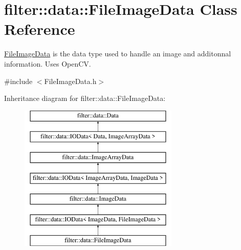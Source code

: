 \hypertarget{classfilter_1_1data_1_1_file_image_data}{}\section{filter\+:\+:data\+:\+:File\+Image\+Data Class Reference}
\label{classfilter_1_1data_1_1_file_image_data}


\hyperlink{classfilter_1_1data_1_1_file_image_data}{File\+Image\+Data} is the data type used to handle an image and additonnal information. Uses Open\+CV.  




{\ttfamily \#include $<$File\+Image\+Data.\+h$>$}

Inheritance diagram for filter\+:\+:data\+:\+:File\+Image\+Data\+:\begin{figure}[H]
\begin{center}
\leavevmode
\includegraphics[height=7.000000cm]{d7/dc4/classfilter_1_1data_1_1_file_image_data}
\end{center}
\end{figure}
